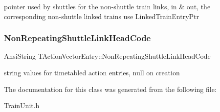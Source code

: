 pointer used by shuttles for the non-\/shuttle train links, in \& out, the corresponding non-\/shuttle linked trains use Linked\+Train\+Entry\+Ptr \mbox{\label{class_t_action_vector_entry_ae142e8e9d3a842c9b1d81bcd4e93e291}} 
\subsubsection{\texorpdfstring{Non\+Repeating\+Shuttle\+Link\+Head\+Code}{NonRepeatingShuttleLinkHeadCode}}
{\footnotesize\ttfamily Ansi\+String T\+Action\+Vector\+Entry\+::\+Non\+Repeating\+Shuttle\+Link\+Head\+Code}

string values for timetabled action entries, null on creation 

The documentation for this class was generated from the following file\+:\begin{DoxyCompactItemize}
\item 
Train\+Unit.\+h\end{DoxyCompactItemize}
